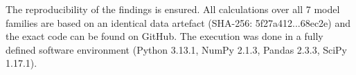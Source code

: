 %
%
%
The reproducibility of the findings is ensured. All calculations over all 7 model families are based on an identical data artefact (SHA-256: 5f27a412...68ec2e) and the exact code can be found on GitHub. The execution was done in a fully defined software environment (Python 3.13.1, NumPy 2.1.3, Pandas 2.3.3, SciPy 1.17.1).
%
%

